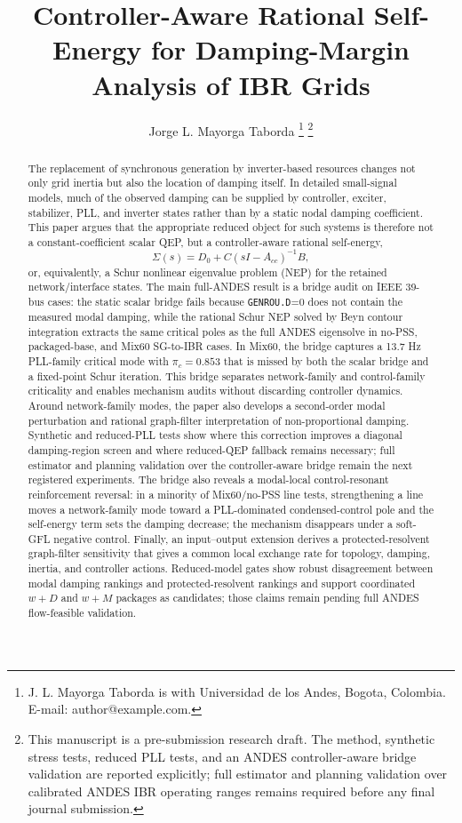\documentclass[journal]{IEEEtran}
\title{Controller-Aware Rational Self-Energy for Damping-Margin Analysis of IBR Grids}
\author{Jorge L. Mayorga Taborda%
\thanks{J. L. Mayorga Taborda is with Universidad de los Andes, Bogota, Colombia. E-mail: author@example.com.}%
\thanks{This manuscript is a pre-submission research draft. The method, synthetic stress tests, reduced PLL tests, and an ANDES controller-aware bridge validation are reported explicitly; full estimator and planning validation over calibrated ANDES IBR operating ranges remains required before any final journal submission.}}
\begin{document}
\maketitle

\begin{abstract}
The replacement of synchronous generation by inverter-based resources changes not only grid inertia but also the location of damping itself. In detailed small-signal models, much of the observed damping can be supplied by controller, exciter, stabilizer, PLL, and inverter states rather than by a static nodal damping coefficient. This paper argues that the appropriate reduced object for such systems is therefore not a constant-coefficient scalar QEP, but a controller-aware rational self-energy,
\[
\Sigma(s)=D_0+C(sI-A_{cc})^{-1}B,
\]
or, equivalently, a Schur nonlinear eigenvalue problem (NEP) for the retained network/interface states. The main full-ANDES result is a bridge audit on IEEE 39-bus cases: the static scalar bridge fails because \texttt{GENROU.D}=0 does not contain the measured modal damping, while the rational Schur NEP solved by Beyn contour integration extracts the same critical poles as the full ANDES eigensolve in no-PSS, packaged-base, and Mix60 SG-to-IBR cases. In Mix60, the bridge captures a 13.7 Hz PLL-family critical mode with $\pi_c=0.853$ that is missed by both the scalar bridge and a fixed-point Schur iteration. This bridge separates network-family and control-family criticality and enables mechanism audits without discarding controller dynamics. Around network-family modes, the paper also develops a second-order modal perturbation and rational graph-filter interpretation of non-proportional damping. Synthetic and reduced-PLL tests show where this correction improves a diagonal damping-region screen and where reduced-QEP fallback remains necessary; full estimator and planning validation over the controller-aware bridge remain the next registered experiments. The bridge also reveals a modal-local control-resonant reinforcement reversal: in a minority of Mix60/no-PSS line tests, strengthening a line moves a network-family mode toward a PLL-dominated condensed-control pole and the self-energy term sets the damping decrease; the mechanism disappears under a soft-GFL negative control. Finally, an input--output extension derives a protected-resolvent graph-filter sensitivity that gives a common local exchange rate for topology, damping, inertia, and controller actions. Reduced-model gates show robust disagreement between modal damping rankings and protected-resolvent rankings and support coordinated $w+D$ and $w+M$ packages as candidates; those claims remain pending full ANDES flow-feasible validation.
\end{abstract}
\end{document}
